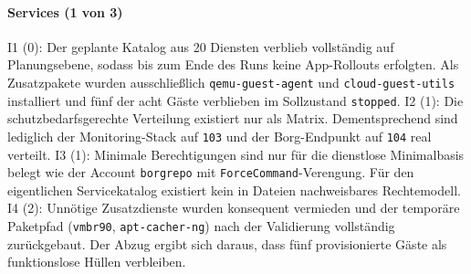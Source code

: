 \paragraph{Services (1 von 3)}
I1 (0): Der geplante Katalog aus 20 Diensten verblieb vollständig auf Planungsebene, sodass bis zum Ende des Runs keine App-Rollouts erfolgten. Als Zusatzpakete wurden ausschließlich \texttt{qemu-guest-agent} und \texttt{cloud-guest-utils} installiert und fünf der acht Gäste verblieben im Sollzustand \texttt{stopped}.\cite{finalsummaryB,masterplanB}
I2 (1): Die schutzbedarfsgerechte Verteilung existiert nur als Matrix. Dementsprechend sind lediglich der Monitoring-Stack auf \texttt{103} und der
Borg-Endpunkt auf \texttt{104} real verteilt.\cite{masterplanB,finalsummaryB}
I3 (1): Minimale Berechtigungen sind nur für die dienstlose Minimalbasis belegt wie der Account \texttt{borgrepo} mit \texttt{ForceCommand}-Verengung.
Für den eigentlichen Servicekatalog existiert kein in Dateien nachweisbares Rechtemodell.\cite{section5scriptB,finalsummaryB}
I4 (2): Unnötige Zusatzdienste wurden konsequent vermieden und der temporäre Paketpfad (\texttt{vmbr90}, \texttt{apt-cacher-ng}) nach der Validierung vollständig zurückgebaut. 
Der Abzug ergibt sich daraus, dass fünf provisionierte Gäste als funktionslose Hüllen verbleiben.\cite{finalsummaryB,implementationlogB}

